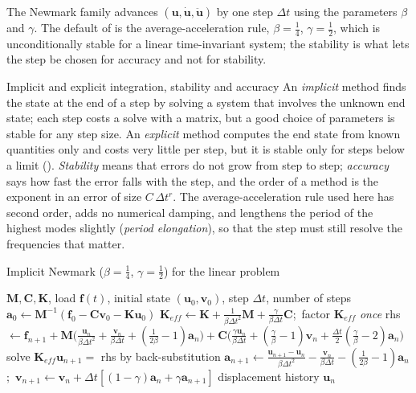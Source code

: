 The Newmark family \citep{newmark1959} advances $(\bm u,\dot{\bm u},\ddot{\bm u})$ by one step $\Delta t$ using the parameters $\beta$ and $\gamma$. The default of  is the average-acceleration rule, $\beta=\tfrac14$, $\gamma=\tfrac12$, which is unconditionally stable for a linear time-invariant system; the stability is what lets the step be chosen for accuracy and not for stability.

\begin{sidenote}{Implicit and explicit integration, stability and accuracy}
An \emph{implicit} method finds the state at the end of a step by solving a system that involves the unknown end state; each step costs a solve with a matrix, but a good choice of parameters is stable for any step size. An \emph{explicit} method computes the end state from known quantities only and costs very little per step, but it is stable only for steps below a limit (). \emph{Stability} means that errors do not grow from step to step; \emph{accuracy} says how fast the error falls with the step, and the order of a method is the exponent in an error of size $C\,\Delta t^{r}$. The average-acceleration rule used here has second order, adds no numerical damping, and lengthens the period of the highest modes slightly (\emph{period elongation}), so that the step must still resolve the frequencies that matter.
\end{sidenote}

\begin{algbox}{Implicit Newmark ($\beta=\tfrac14$, $\gamma=\tfrac12$) for the linear problem}
\begin{pseudo}
\Require $\bm M,\bm C,\bm K$, load $\bm f(t)$, initial state $(\bm u_0,\bm v_0)$, step $\Delta t$, number of steps
\State $\bm a_0\gets\bm M^{-1}(\bm f_0-\bm C\bm v_0-\bm K\bm u_0)$
\State $\bm K_{eff}\gets\bm K+\frac{1}{\beta\Delta t^2}\bm M+\frac{\gamma}{\beta\Delta t}\bm C$;\ factor $\bm K_{eff}$ \emph{once}
  \State rhs $\gets\bm f_{n+1}+\bm M\big(\tfrac{\bm u_n}{\beta\Delta t^2}+\tfrac{\bm v_n}{\beta\Delta t}+(\tfrac1{2\beta}-1)\bm a_n\big)+\bm C\big(\tfrac{\gamma\bm u_n}{\beta\Delta t}+(\tfrac\gamma\beta-1)\bm v_n+\tfrac{\Delta t}2(\tfrac\gamma\beta-2)\bm a_n\big)$
  \State solve $\bm K_{eff}\bm u_{n+1}=$ rhs by back-substitution
  \State $\bm a_{n+1}\gets\frac{\bm u_{n+1}-\bm u_n}{\beta\Delta t^2}-\frac{\bm v_n}{\beta\Delta t}-(\tfrac1{2\beta}-1)\bm a_n$;\ $\bm v_{n+1}\gets\bm v_n+\Delta t[(1-\gamma)\bm a_n+\gamma\bm a_{n+1}]$
\EndFor
\Ensure displacement history $\bm u_n$
\end{pseudo}
\end{algbox}

